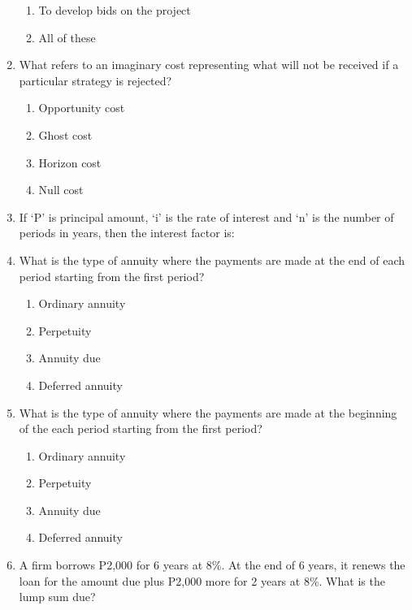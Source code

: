 \documentclass[11pt,a4paper]{article}
\begin{document}
\begin{enumerate}
\begin{enumerate}[label=\Alph*.]
\item{To develop bids on the project}
\item{All of these}
\end{enumerate}
\item{What refers to an imaginary cost representing what will not be received if a particular strategy is rejected?}
\begin{enumerate}[label=\Alph*.]
\item{Opportunity cost}
\item{Ghost cost}
\item{Horizon cost}
\item{Null cost}
\end{enumerate}
\item{If `P' is principal amount, `i' is the rate of interest and `n' is the number of periods in years, then the interest factor is:
}
\\
\item{What is the type of annuity where the payments are made at the end of each period starting from the first period?}
\begin{enumerate}[label=\Alph*.]
\item{Ordinary annuity}
\item{Perpetuity}
\item{Annuity due}
\item{Deferred annuity}
\end{enumerate}
\item{What is the type of annuity where the payments are made at the beginning of the each period starting from the first period?}
\begin{enumerate}[label=\Alph*.]
\item{Ordinary annuity}
\item{Perpetuity}
\item{Annuity due}
\item{Deferred annuity}
\end{enumerate}
\item{A firm borrows P2,000 for 6 years at 8\%. At the end of 6 years, it renews the loan for the amount due plus P2,000 more for 2 years at 8\%. What is the lump sum due?}

\end{enumerate}
\end{document}
